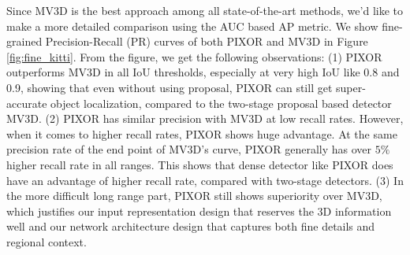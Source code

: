 Since MV3D is the best approach among all state-of-the-art methods, we'd like to make a more detailed comparison using the AUC based AP metric. We show fine-grained Precision-Recall (PR) curves of both PIXOR and MV3D in Figure \ref{fig:fine_kitti}. From the figure, we get the following observations: (1) PIXOR outperforms MV3D in all IoU thresholds, especially at very high IoU like 0.8 and 0.9, showing that even without using proposal, PIXOR can still get super-accurate object localization, compared to the two-stage proposal based detector MV3D. (2) PIXOR has similar precision with MV3D at low recall rates. However, when it comes to higher recall rates, PIXOR shows huge advantage. At the same precision rate of the end point of MV3D's curve, PIXOR generally has over $5\%$ higher recall rate in all ranges. This shows that dense detector like PIXOR does have an advantage of higher recall rate, compared with two-stage detectors. (3) In the more difficult long range part, PIXOR still shows superiority over MV3D, which justifies our input representation design that reserves the 3D information well and our network architecture design that captures both fine details and regional context.


